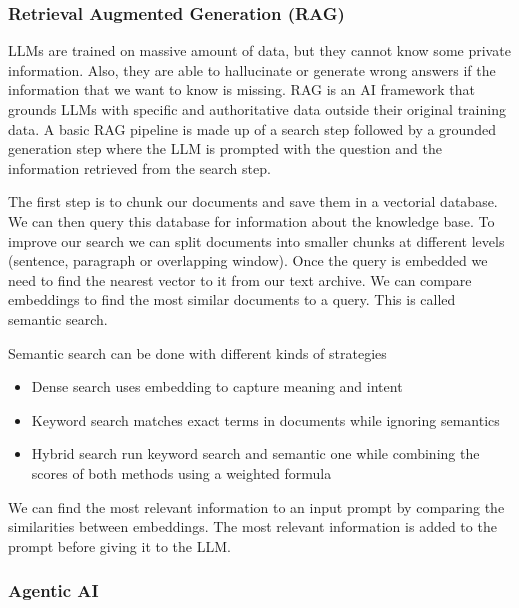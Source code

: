\subsubsection{Retrieval Augmented Generation (RAG)}

LLMs are trained on massive amount of data, but they cannot know some private information. Also, they are able to hallucinate or generate wrong answers if the information that we want to know is missing. RAG is an AI framework that grounds LLMs with specific and authoritative data outside their original training data. A basic RAG pipeline is made up of a search step followed by a grounded generation step where the LLM is prompted with the question and the information retrieved from the search step. 

\vspace{10pt}

The first step is to chunk our documents and save them in a vectorial database. We can then query this database for information about the knowledge base. To improve our search we can split documents into smaller chunks at different levels (sentence, paragraph or overlapping window). Once the query is embedded we need to find the nearest vector to it from our text archive. We can compare embeddings to find the most similar documents to a query. This is called semantic search. 

\vspace{10pt}

Semantic search can be done with different kinds of strategies

\begin{itemize}
    \item Dense search \ra uses embedding to capture meaning and intent
    \item Keyword search \ra matches exact terms in documents while ignoring semantics
    \item Hybrid search \ra run keyword search and semantic one while combining the scores of both methods using a weighted formula
\end{itemize}

We can find the most relevant information to an input prompt by comparing the similarities between embeddings. The most relevant information is added to the prompt before giving it to the LLM. 

\subsubsection{Agentic AI}

